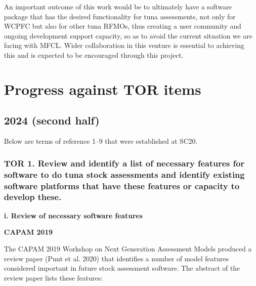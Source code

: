 \documentclass{SCreport}
\begin{document}
An important outcome of this work would be to ultimately have a software package
that has the desired functionality for tuna assessments, not only for WCPFC but
also for other tuna RFMOs, thus creating a user community and ongoing
development support capacity, so as to avoid the current situation we are facing
with MFCL. Wider collaboration in this venture is essential to achieving this
and is expected to be encouraged through this project.

\newpage

\section{Progress against TOR items}

\subsection{2024 (second half)}

Below are terms of reference 1--9 that were established at SC20.

\subsubsection{TOR 1. Review and identify a list of necessary features for
  software to do tuna stock assessments and identify existing software platforms
  that have these features or capacity to develop these.}

\vspace{2ex}

\textbf{i. Review of necessary software features}

\vspace{2ex}

\textbf{CAPAM 2019}

\vspace{1ex}

The CAPAM 2019 Workshop on Next Generation Assessment Models produced a review
paper (Punt et al. 2020) that identifies a number of model features considered
important in future stock assessment software. The abstract of the review paper
lists these features:
\end{document}
